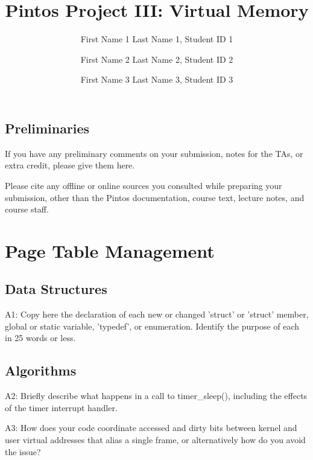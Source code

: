 \documentclass[journal]{IEEEtran}
\begin{document}
\title{\LARGE{Pintos Project III: Virtual Memory}}

\author{First Name 1 Last Name 1, Student ID 1 \\\and 
        First Name 2 Last Name 2, Student ID 2 \\\and 
        First Name 3 Last Name 3, Student ID 3} 


\maketitle
\subsection{Preliminaries}
If you have any preliminary comments on your submission, notes for the TAs, or extra credit, please give them here.

Please cite any offline or online sources you consulted while preparing your submission, other than the Pintos documentation, course text, lecture notes, and course staff.
\section{Page Table Management}
\subsection{Data Structures}
A1: Copy here the declaration of each new or changed 'struct' or 'struct' member, global or static variable, 'typedef', or enumeration.  Identify the purpose of each in 25 words or less.
\subsection{Algorithms}
A2: Briefly describe what happens in a call to timer\_sleep(), including the effects of the timer interrupt handler.

A3: How does your code coordinate accessed and dirty bits between kernel and user virtual addresses that alias a single frame, or alternatively how do you avoid the issue?
\end{document}
